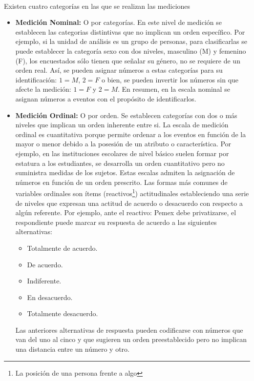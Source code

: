 \documentclass[12pt,hidelinks]{article}
\begin{document}
	\paragraph{}Existen cuatro categorías en las que se realizan las mediciones
	\begin{itemize}
		\item \textbf{Medición Nominal:} O por categorías. En este nivel de medición se establecen las categorias distintivas que no implican un orden específico. Por ejemplo, si la unidad de análisis es un grupo de personas, para clasificarlas se puede establecer la categoría sexo con dos niveles, masculino (M) y femenino (F), los encuestados sólo tienen que señalar su género, no se requiere de un orden real. Así, se pueden asignar números a estas categorías para su identificación: $1=M$, $2=F$ o bien, se pueden invertir los números sin que afecte la medición: $1=F$ y $2=M$. En resumen, en la escala nominal se asignan números a eventos con el propósito de identificarlos.
		\item  \textbf{Medición Ordinal:} O por orden. Se establecen categorías con dos o más niveles que implican un orden inherente entre si. La escala de medición ordinal es cuantitativa porque permite ordenar a los eventos en función de la mayor o menor debido a la posesión de un atributo o característica. Por ejemplo, en las instituciones escolares de nivel básico suelen formar por estatura a los estudiantes, se desarrolla un orden cuantitativo pero no suministra medidas de los sujetos. Estas escalas admiten la asignación de números en función de un orden prescrito. Las formas más comunes de variables ordinales son ítems (reactivos\footnote{La posición de una persona frente a algo}) actitudinales estableciendo una serie de niveles que expresan una actitud de acuerdo o desacuerdo con respecto a algún referente. Por ejemplo, ante el reactivo: Pemex debe privatizarse, el respondiente puede marcar su
		respuesta de acuerdo a las siguientes alternativas:
		\begin{itemize}
			\item Totalmente de acuerdo.
			\item De acuerdo.
			\item Indiferente.
			\item En desacuerdo.
			\item Totalmente desacuerdo.
		\end{itemize}
		Las anteriores alternativas de respuesta pueden codificarse con números que van del uno al cinco y que sugieren un orden preestablecido pero no implican una distancia entre un número y otro.

\end{itemize}
\end{document}
